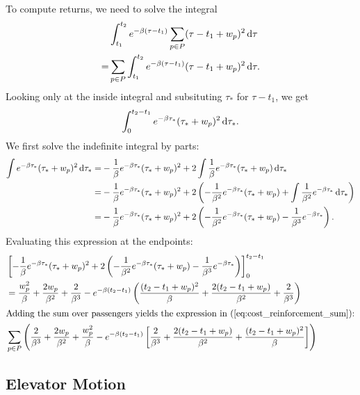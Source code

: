 To compute returns, we need to solve the integral
\begin{align*}
    &\int_{t_1}^{t_2} e^{-\beta(\tau - t_1)} \sum_{p\in P} (\tau - t_1 + w_p)^2 \mathop{}\!\mathrm{d} \tau\\
    =&\sum_{p\in P} \int_{t_1}^{t_2} e^{-\beta(\tau - t_1)} (\tau - t_1 + w_p)^2 \mathop{}\!\mathrm{d} \tau.
\end{align*}
Looking only at the inside integral and subsituting $\tau_*$ for $\tau - t_1$, we get
\begin{equation*}
    \int_{0}^{t_2 - t_1} e^{-\beta\tau_*} (\tau_* + w_p)^2 \mathop{}\!\mathrm{d} \tau_*.
\end{equation*}
We first solve the indefinite integral by parts:
\begin{align*}
    \int e^{-\beta\tau_*} (\tau_* + w_p)^2 \mathop{}\!\mathrm{d} \tau_*
    =& -\frac{1}{\beta}e^{-\beta\tau_*} (\tau_* + w_p)^2 + 2 \int \frac{1}{\beta}e^{-\beta\tau_*} (\tau_* + w_p)\mathop{}\!\mathrm{d} \tau_*\\
    =& -\frac{1}{\beta}e^{-\beta\tau_*} (\tau_* + w_p)^2 + 2 \left(-\frac{1}{\beta^2}e^{-\beta\tau_*} (\tau_* + w_p) + \int\frac{1}{\beta^2}e^{-\beta\tau_*} \mathop{}\!\mathrm{d} \tau_*\right)\\
    =& -\frac{1}{\beta}e^{-\beta\tau_*} (\tau_* + w_p)^2 + 2 \left(-\frac{1}{\beta^2}e^{-\beta\tau_*} (\tau_* + w_p) -\frac{1}{\beta^3}e^{-\beta\tau_*} \right).\\
\end{align*}
Evaluating this expression at the endpoints:
\begin{align*}
    &\left[-\frac{1}{\beta}e^{-\beta\tau_*} (\tau_* + w_p)^2 + 2 \left(-\frac{1}{\beta^2}e^{-\beta\tau_*} (\tau_* + w_p) -\frac{1}{\beta^3}e^{-\beta\tau_*} \right)\right]_{0}^{t_2 - t_1}\\
    &=\frac{w_p^2}{\beta} + \frac{2 w_p}{\beta^2} + \frac{2}{\beta^3} - e^{-\beta(t_2 - t_1)}\left( \frac{(t_2 - t_1 + w_p)^2}{\beta} + \frac{2(t_2 - t_1 + w_p)}{\beta^2} + \frac{2}{\beta^3}\right)\\
    \shortintertext{Adding the sum over passengers yields the expression in (\ref{eq:cost_reinforcement_sum}):}
    &\sum_{p\in P}\left(
        \frac{2}{\beta^3} + \frac{2 w_p}{\beta^2} + \frac{w_p^2}{\beta} - e^{-\beta(t_2 - t_1)}\left[ \frac{2}{\beta^3} + \frac{2(t_2 - t_1 + w_p)}{\beta^2} + \frac{(t_2 - t_1 + w_p)^2}{\beta}\right]\right)
\end{align*}

\label{sec:app:elevator_motion}
\subsection{Elevator Motion}

